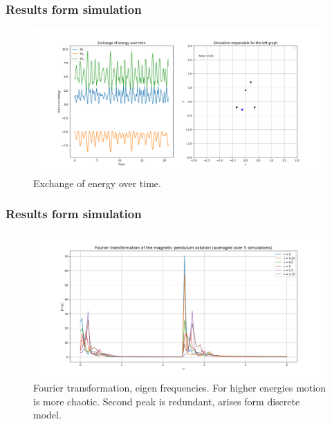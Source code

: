 \documentclass{beamer}
\begin{document}
\begin{frame}

\frametitle{Results form simulation}

\begin{figure}[H]
	\centering
	\includegraphics[width=1.2\textwidth]{energy.png}
	  \caption{Exchange of energy over time.}
\end{figure}

\end{frame}



\begin{frame}

\frametitle{Results form simulation}

\begin{figure}[H]
	\centering
	\includegraphics[width=1.1\textwidth]{fourier.png}
	  \caption{Fourier transformation, eigen frequencies. For higher energies motion is more chaotic. Second peak is redundant, arises form discrete model.}
\end{figure}

\end{frame}

\end{document}
